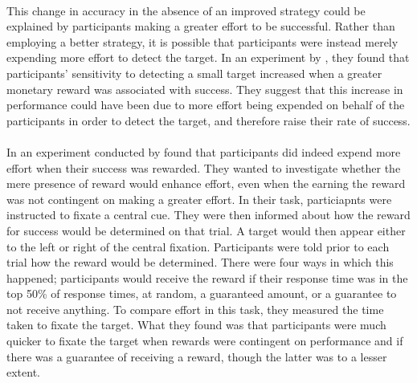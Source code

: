 \documentclass[12pt]{article}
\begin{document}

\paragraph{} This change in accuracy in the absence of an improved strategy could be explained by participants making a greater effort to be successful. Rather than employing a better strategy, it is possible that participants were instead merely expending more effort to detect the target. In an experiment by \cite{engelmann2007motivation}, they found that participants' sensitivity to detecting a small target increased when a greater monetary reward was associated with success. They suggest that this increase in performance could have been due to more effort being expended on behalf of the participants in order to detect the target, and therefore raise their rate of success. 

\paragraph{} In an experiment conducted by \cite{manohar2017distinct} found that participants did indeed expend more effort when their success was rewarded. They wanted to investigate whether the mere presence of reward would enhance effort, even when the earning the reward was not contingent on making a greater effort. In their task, particiapnts were instructed to fixate a central cue. They were then informed about how the reward for success would be determined on that trial. A target would then appear either to the left or right of the central fixation. Participants were told prior to each trial how the reward would be determined. There were four ways in which this happened; participants would receive the reward if their response time was in the top 50\% of response times, at random, a guaranteed amount, or a guarantee to not receive anything. To compare effort in this task, they measured the time taken to fixate the target. What they found was that participants were much quicker to fixate the target when rewards were contingent on performance and if there was a guarantee of receiving a reward, though the latter was to a lesser extent. 
\end{document}
